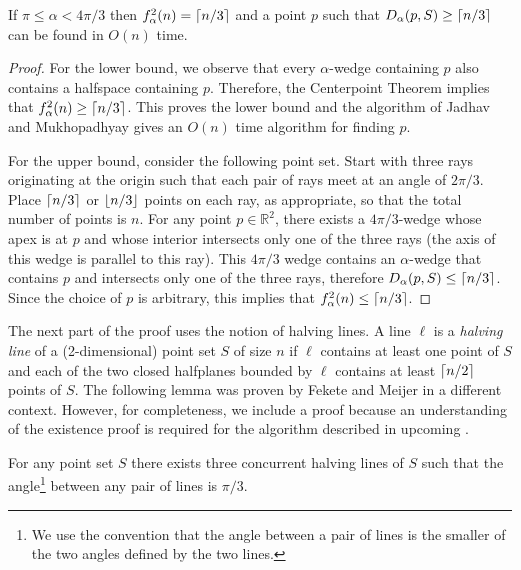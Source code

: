 \documentclass[lotsofwhite]{patmorin}
\begin{document}
\begin{lem}
If $\pi\le \alpha < 4\pi/3$ then $f^2_\alpha(n) = \left\lceil n/3 \right\rceil$ and a
point $p$ such that $D_\alpha(p,S)\ge \left\lceil n/3 \right\rceil$ can be found in $O(n)$ time.
\end{lem}

\begin{proof} 
For the lower bound, we observe that every $\alpha$-wedge containing
$p$ also contains a halfspace containing $p$.  Therefore, the
Centerpoint Theorem implies that $f^2_\alpha(n) \ge \left\lceil n/3 \right\rceil$.  This
proves the lower bound and the algorithm of Jadhav and Mukhopadhyay
\cite{jm94} gives an $O(n)$ time algorithm for finding $p$.

For the upper bound, consider the following point set.  Start with
three rays originating at the origin such that each pair of rays meet at an
angle of $2\pi/3$.  Place $\left\lceil n/3 \right\rceil$ or $\left\lfloor n/3 \right\rfloor$ points on each
ray, as appropriate, so that the total number of points is $n$.  For
any point $p\in\mathbb{R}^2$, there exists a $4\pi/3$-wedge whose apex
is at $p$ and whose interior intersects only one of the three rays
(the axis of this wedge is parallel to this ray). This $4\pi/3$ wedge
contains an $\alpha$-wedge that contains $p$ and intersects only one
of the three rays, therefore $D_\alpha(p,S)\le \left\lceil n/3 \right\rceil$.  Since the
choice of $p$ is arbitrary, this implies that $f^2_\alpha(n) \le
\left\lceil n/3 \right\rceil$.  
\end{proof}

The next part of the proof uses the notion of halving lines.  A line
$\ell$ is a \emph{halving line} of a (2-dimensional) point set $S$ of
size $n$ if $\ell$ contains at least one point of $S$ and each of the
two closed halfplanes bounded by $\ell$ contains at least $\left\lceil n/2 \right\rceil$
points of $S$.  The following lemma was proven by Fekete and Meijer
\cite[Lemma~2]{fm00} in a different context.  However, for
completeness, we include a proof because an understanding of the
existence proof is required for the algorithm described in upcoming
.

\begin{lem}
For any point set $S$ there exists three concurrent halving lines 
of $S$ such that the angle\footnote{We use the convention that
the angle between a pair of lines is the smaller of the two angles
defined by the two lines.} between any pair of lines is $\pi/3$.
\end{lem}
\end{document}
